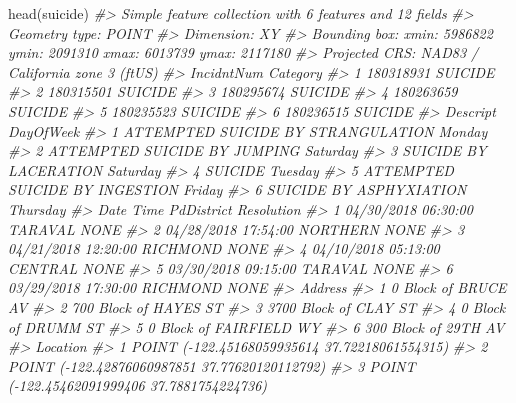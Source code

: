 \documentclass[
]{krantz}
\makeatletter
\newenvironment{Shaded}{\begin{snugshade}}{\end{snugshade}}
\newcommand{\CommentTok}[1]{\textcolor[rgb]{0.37,0.37,0.37}{\textit{#1}}}
\newcommand{\FunctionTok}[1]{\textcolor[rgb]{0,0,0}{#1}}
\newcommand{\NormalTok}[1]{#1}
\newenvironment{kframe}{%
\medskip{}
\setlength{\fboxsep}{.8em}
 \def\at@end@of@kframe{}%
 \ifinner\ifhmode%
  \def\at@end@of@kframe{\end{minipage}}%
  \begin{minipage}{\columnwidth}%
 \fi\fi%
 \def\FrameCommand##1{\hskip\@totalleftmargin \hskip-\fboxsep
 \colorbox{shadecolor}{##1}\hskip-\fboxsep
     \hskip-\linewidth \hskip-\@totalleftmargin \hskip\columnwidth}%
 \MakeFramed {\advance\hsize-\width
   \@totalleftmargin\z@ \linewidth\hsize
   \@setminipage}}%
 {\par\unskip\endMakeFramed%
 \at@end@of@kframe}
\renewenvironment{Shaded}{\begin{kframe}}{\end{kframe}}
\makeatother
\begin{document}
\begin{Shaded}
\begin{Highlighting}[]
\FunctionTok{head}\NormalTok{(suicide)}
\CommentTok{\#\textgreater{} Simple feature collection with 6 features and 12 fields}
\CommentTok{\#\textgreater{} Geometry type: POINT}
\CommentTok{\#\textgreater{} Dimension:     XY}
\CommentTok{\#\textgreater{} Bounding box:  xmin: 5986822 ymin: 2091310 xmax: 6013739 ymax: 2117180}
\CommentTok{\#\textgreater{} Projected CRS: NAD83 / California zone 3 (ftUS)}
\CommentTok{\#\textgreater{}   IncidntNum Category}
\CommentTok{\#\textgreater{} 1  180318931  SUICIDE}
\CommentTok{\#\textgreater{} 2  180315501  SUICIDE}
\CommentTok{\#\textgreater{} 3  180295674  SUICIDE}
\CommentTok{\#\textgreater{} 4  180263659  SUICIDE}
\CommentTok{\#\textgreater{} 5  180235523  SUICIDE}
\CommentTok{\#\textgreater{} 6  180236515  SUICIDE}
\CommentTok{\#\textgreater{}                             Descript DayOfWeek}
\CommentTok{\#\textgreater{} 1 ATTEMPTED SUICIDE BY STRANGULATION    Monday}
\CommentTok{\#\textgreater{} 2       ATTEMPTED SUICIDE BY JUMPING  Saturday}
\CommentTok{\#\textgreater{} 3              SUICIDE BY LACERATION  Saturday}
\CommentTok{\#\textgreater{} 4                            SUICIDE   Tuesday}
\CommentTok{\#\textgreater{} 5     ATTEMPTED SUICIDE BY INGESTION    Friday}
\CommentTok{\#\textgreater{} 6            SUICIDE BY ASPHYXIATION  Thursday}
\CommentTok{\#\textgreater{}         Date     Time PdDistrict Resolution}
\CommentTok{\#\textgreater{} 1 04/30/2018 06:30:00    TARAVAL       NONE}
\CommentTok{\#\textgreater{} 2 04/28/2018 17:54:00   NORTHERN       NONE}
\CommentTok{\#\textgreater{} 3 04/21/2018 12:20:00   RICHMOND       NONE}
\CommentTok{\#\textgreater{} 4 04/10/2018 05:13:00    CENTRAL       NONE}
\CommentTok{\#\textgreater{} 5 03/30/2018 09:15:00    TARAVAL       NONE}
\CommentTok{\#\textgreater{} 6 03/29/2018 17:30:00   RICHMOND       NONE}
\CommentTok{\#\textgreater{}                   Address}
\CommentTok{\#\textgreater{} 1     0 Block of BRUCE AV}
\CommentTok{\#\textgreater{} 2   700 Block of HAYES ST}
\CommentTok{\#\textgreater{} 3   3700 Block of CLAY ST}
\CommentTok{\#\textgreater{} 4     0 Block of DRUMM ST}
\CommentTok{\#\textgreater{} 5 0 Block of FAIRFIELD WY}
\CommentTok{\#\textgreater{} 6    300 Block of 29TH AV}
\CommentTok{\#\textgreater{}                                         Location}
\CommentTok{\#\textgreater{} 1  POINT ({-}122.45168059935614 37.72218061554315)}
\CommentTok{\#\textgreater{} 2  POINT ({-}122.42876060987851 37.77620120112792)}
\CommentTok{\#\textgreater{} 3   POINT ({-}122.45462091999406 37.7881754224736)}

\end{Highlighting}
\end{Shaded}
\end{document}
